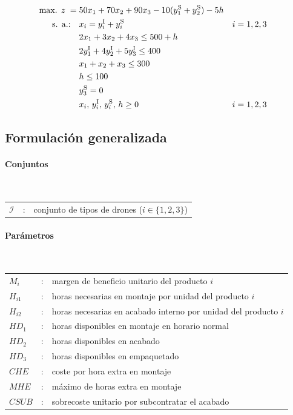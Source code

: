 \begin{align}
\mbox{max. } z \;=\;&
50x_1 + 70x_2 + 90x_3
- 10(y_1^{\mathrm{S}} + y_2^{\mathrm{S}})
- 5h \notag\\
\mbox{s. a.:}\quad
& x_i = y_i^{\mathrm{I}} + y_i^{\mathrm{S}} && i=1,2,3 \notag\\
& 2x_1 + 3x_2 + 4x_3 \leq 500 + h \notag\\
& 2y_1^{\mathrm{I}} + 4y_2^{\mathrm{I}} + 5y_3^{\mathrm{I}} \leq 400 \notag\\
& x_1 + x_2 + x_3 \leq 300 \notag\\
& h \leq 100 \notag\\
& y_3^{\mathrm{S}} = 0 \notag\\
& x_i,\, y_i^{\mathrm{I}},\, y_i^{\mathrm{S}},\, h \geq 0 && i=1,2,3 \notag
\end{align}


\subsection{Formulación generalizada}

\paragraph{Conjuntos}\mbox{}\\
\begin{tabular}{lcl}
$\mathcal{I}$ & : & conjunto de tipos de drones ($i \in \{1,2,3\}$) \\
\end{tabular}

\paragraph{Parámetros}\mbox{}\\
\begin{tabular}{lcl}
$M_i$     & : & margen de beneficio unitario del producto $i$ \\
$H_{i1}$  & : & horas necesarias en montaje por unidad del producto $i$ \\
$H_{i2}$  & : & horas necesarias en acabado interno por unidad del producto $i$ \\
$HD_1$    & : & horas disponibles en montaje en horario normal \\
$HD_2$    & : & horas disponibles en acabado \\
$HD_3$    & : & horas disponibles en empaquetado \\
$CHE$     & : & coste por hora extra en montaje \\
$MHE$     & : & máximo de horas extra en montaje \\
$CSUB$    & : & sobrecoste unitario por subcontratar el acabado \\
\end{tabular}

